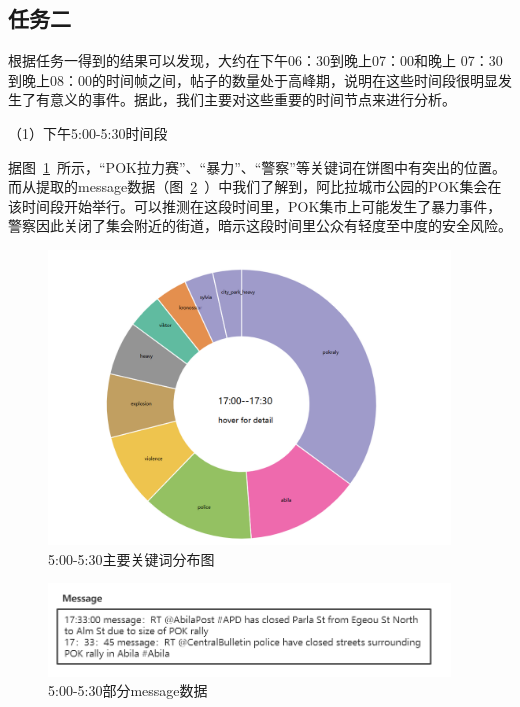 \documentclass[a4paper]{article}
\begin{document}
\subsection{任务二}
根据任务一得到的结果可以发现，大约在下午06：30到晚上07：00和晚上 07：30到晚上08：00的时间帧之间，帖子的数量处于高峰期，说明在这些时间段很明显发生了有意义的事件。据此，我们主要对这些重要的时间节点来进行分析。

（1）下午5:00-5:30时间段

据图~\ref{fig:2-1}~所示，“POK拉力赛”、“暴力”、“警察”等关键词在饼图中有突出的位置。而从提取的message数据（图~\ref{fig:2-2}~）中我们了解到，阿比拉城市公园的POK集会在该时间段开始举行。可以推测在这段时间里，POK集市上可能发生了暴力事件，警察因此关闭了集会附近的街道，暗示这段时间里公众有轻度至中度的安全风险。
\begin{figure}[H]
  \centering
  \includegraphics[width=0.95\textwidth]{images/2-1.png}
  \caption{5:00-5:30主要关键词分布图}\label{fig:2-1}
  \vspace{\baselineskip}
\end{figure}

\begin{figure}[H]
  \centering
  \includegraphics[width=0.95\textwidth]{images/2-2.png}
  \caption{5:00-5:30部分message数据}\label{fig:2-2}
  \vspace{\baselineskip}
\end{figure}
\end{document}
